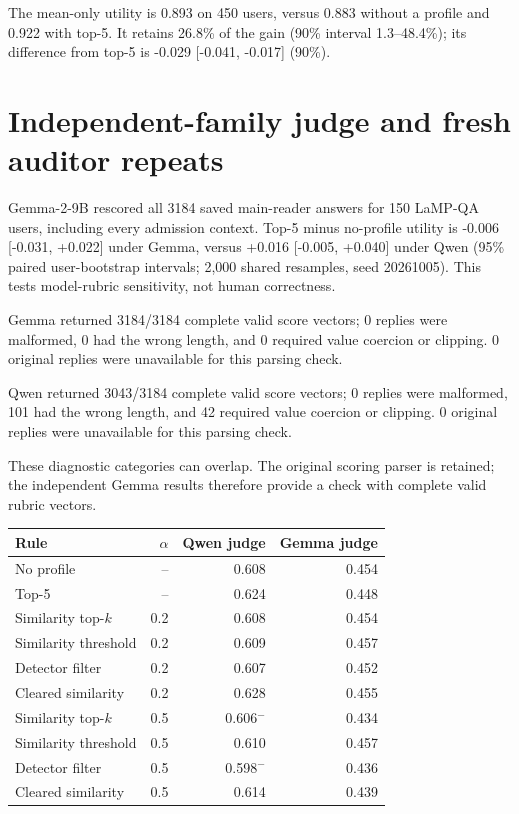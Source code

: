 The mean-only utility is 0.893 on 450 users, versus 0.883 without a profile and 0.922 with top-5. It retains 26.8\% of the gain (90\% interval 1.3--48.4\%); its difference from top-5 is -0.029 [-0.041, -0.017] (90\%).

\section{Independent-family judge and fresh auditor repeats}

Gemma-2-9B rescored all 3184 saved main-reader answers for 150 LaMP-QA users, including every admission context. Top-5 minus no-profile utility is -0.006 [-0.031, +0.022] under Gemma, versus +0.016 [-0.005, +0.040] under Qwen (95\% paired user-bootstrap intervals; 2,000 shared resamples, seed 20261005). This tests model-rubric sensitivity, not human correctness.

Gemma returned 3184/3184 complete valid score vectors; 0 replies were malformed, 0 had the wrong length, and 0 required value coercion or clipping. 0 original replies were unavailable for this parsing check.

Qwen returned 3043/3184 complete valid score vectors; 0 replies were malformed, 101 had the wrong length, and 42 required value coercion or clipping. 0 original replies were unavailable for this parsing check.

These diagnostic categories can overlap. The original scoring parser is retained; the independent Gemma results therefore provide a check with complete valid rubric vectors.

\begin{center}\small\begin{tabular}{lrrr}\toprule

Rule & $\alpha$ & Qwen judge & Gemma judge \\ \midrule

No profile & -- & 0.608 & 0.454 \\

Top-5 & -- & 0.624 & 0.448 \\

Similarity top-$k$ & 0.2 & 0.608 & 0.454 \\

Similarity threshold & 0.2 & 0.609 & 0.457 \\

Detector filter & 0.2 & 0.607 & 0.452 \\

Cleared similarity & 0.2 & 0.628 & 0.455 \\

Similarity top-$k$ & 0.5 & 0.606$^{-}$ & 0.434 \\

Similarity threshold & 0.5 & 0.610 & 0.457 \\

Detector filter & 0.5 & 0.598$^{-}$ & 0.436 \\

Cleared similarity & 0.5 & 0.614 & 0.439 \\

\bottomrule\end{tabular}\end{center}

